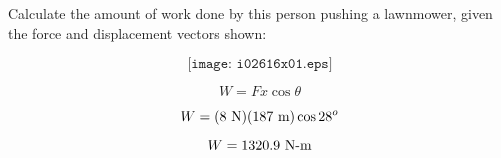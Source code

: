 

Calculate the amount of work done by this person pushing a lawnmower, given the force and displacement vectors shown:

$$\texttt{[image: i02616x01.eps]}$$







$$W = F x \cos \theta$$

$$W = (8 \hbox{ N}) (187 \hbox{ m}) \cos 28^o$$

$$W = 1320.9 \hbox{ N-m}$$











